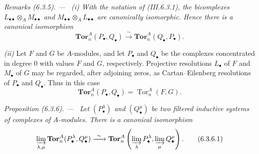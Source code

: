 \documentclass[10pt,oneside]{book}
\newcommand{\Tor}{\operatorname{Tor}}
\newcommand{\sref}[2][]{(#2)}
\newenvironment{proposition}[1][]{\par\medskip\noindent\itshape Proposition (#1). ---\ }{\par}
\newenvironment{remarks}[1][]{\par\medskip\noindent\itshape Remarks (#1). ---\ }{\par}
\begin{document}
\begin{remarks}[6.3.5]
\label{III.6.3.5}
\emph{(i)} With the notation of \sref{III.6.3.1}, the bicomplexes
$L_{\bullet\bullet}\otimes_AM_{\bullet\bullet}$ and
$M_{\bullet\bullet}\otimes_AL_{\bullet\bullet}$ are canonically
isomorphic.  Hence there is a canonical isomorphism
\[
  \mathbf{Tor}_n^A(P_\bullet,Q_\bullet)
  \xrightarrow{\ \sim\ }
  \mathbf{Tor}_n^A(Q_\bullet,P_\bullet).
\]

\emph{(ii)} Let $F$ and $G$ be $A$-modules, and let $P_\bullet$
and $Q_\bullet$ be the complexes concentrated in degree $0$ with
values $F$ and $G$, respectively.  Projective resolutions
$L_\bullet$ of $F$ and $M_\bullet$ of $G$ may be regarded, after
adjoining zeros, as Cartan--Eilenberg resolutions of $P_\bullet$
and $Q_\bullet$.  Thus in this case
\[
  \mathbf{Tor}_n^A(P_\bullet,Q_\bullet)=\Tor_n^A(F,G).
\]
\end{remarks}

\begin{proposition}[6.3.6]
\label{III.6.3.6}
Let $(P_\bullet^\lambda)$ and $(Q_\bullet^\mu)$ be two filtered
inductive systems of complexes of $A$-modules.  There is a
canonical isomorphism
\[
  \varinjlim_{\lambda,\mu}
  \mathbf{Tor}_n^A(P_\bullet^\lambda,Q_\bullet^\mu)
  \xrightarrow{\ \sim\ }
  \mathbf{Tor}_n^A\left(
    \varinjlim_\lambda P_\bullet^\lambda,
    \varinjlim_\mu Q_\bullet^\mu
  \right).
  \tag{6.3.6.1}\label{III.6.3.6.1}
\]
\end{proposition}
\end{document}
